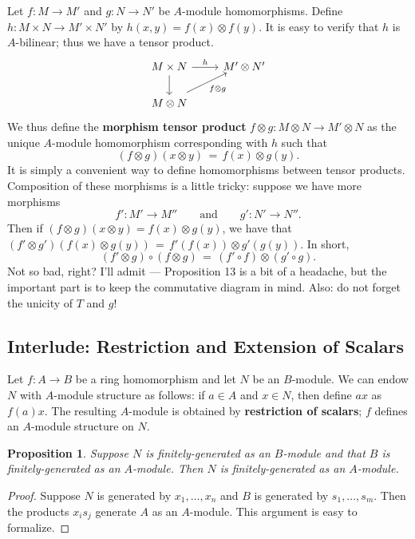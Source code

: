 \documentclass[11pt]{article}
\newtheorem{proposition}{Proposition}
\begin{document}
Let $f : M \to M'$ and $g : N \to N'$ be $A$-module homomorphisms. Define $h : M \times N \to M' \times N'$  by $h(x, y) = f(x) \otimes f(y)$. It is easy to verify that $h$ is $A$-bilinear; thus we have a tensor product.
\[
  \begin{tikzcd}
   M \times N \arrow[d] \arrow[r, "h"]               & M' \otimes N' \\
  M \otimes N \arrow[ru, "f \otimes g"', shift left] &              
  \end{tikzcd}
\]
We thus define the \textbf{morphism tensor product} $f \otimes g : M \otimes N \to M' \otimes N$ as the unique $A$-module homomorphism corresponding with $h$ such that
\[
  (f \otimes g)(x \otimes y) \, = \, f(x) \otimes g(y).
\]
It is simply a convenient way to define homomorphisms between tensor products. Composition of these morphisms is a little tricky: suppose we have more morphisms
\[
  f' : M' \to M'' \qquad \text{and} \qquad g' : N' \to N''.
\]
Then if $(f \otimes g)(x \otimes y) = f(x) \otimes g(y)$, we have that $(f' \otimes g')(f(x) \otimes g(y)) \, = \, f'(f(x)) \otimes g'(g(y))$. In short,
\[
  (f' \otimes g) \circ (f \otimes g) \, = \, (f' \circ f) \otimes (g' \circ g).
\]
Not so bad, right? I'll admit --- Proposition 13 is a bit of a headache, but the important part is to keep the commutative diagram in mind. Also: do not forget the unicity of $T$ and $g$!

\newpage


\subsection{Interlude: Restriction and Extension of Scalars}

Let $f : A \to B$ be a ring homomorphism and let $N$ be an $B$-module. We can endow $N$ with $A$-module structure as follows: if $a \in A$ and $x \in N$, then define $ax$ as $f(a)x$. The resulting $A$-module is obtained by \textbf{restriction of scalars}; $f$ defines an $A$-module structure on $N$.

\begin{adjustwidth}{0.5cm}{}
  \begin{proposition}
    Suppose $N$ is finitely-generated as an $B$-module and that $B$ is finitely-generated as an $A$-module. Then $N$ is finitely-generated as an $A$-module.
  \end{proposition}
  \begin{proof}
    Suppose $N$ is generated by $x_{1}, \ldots, x_{n}$ and $B$ is generated by $s_{1}, \ldots, s_{m}$. Then the products $x_{i}s_{j}$ generate $A$ as an $A$-module. This argument is easy to formalize.
  \end{proof}
\end{adjustwidth}
\end{document}
